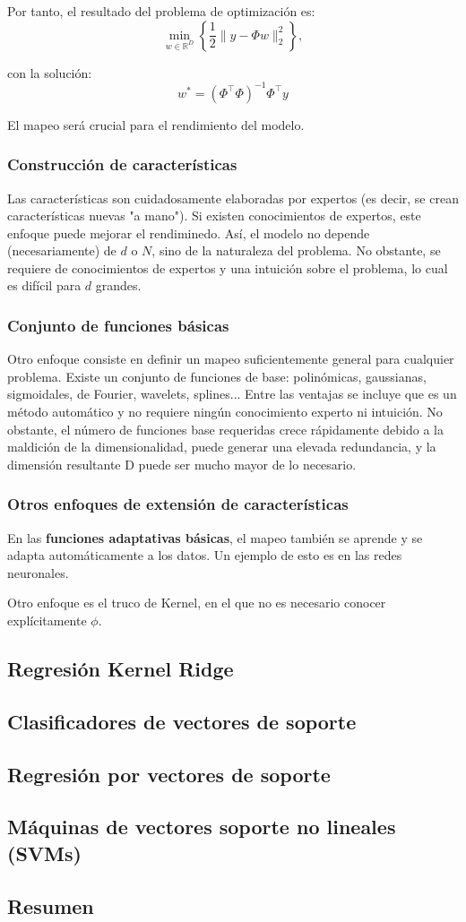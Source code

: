 Por tanto, el resultado del problema de optimización es:
$$\min_{w \in \mathbb{R}^D} \left\{ \frac{1}{2} \|y - \Phi w\|_2^2 \right\},$$

con la solución:
$$w^* = (\Phi^\top \Phi)^{-1} \Phi^\top y$$

El mapeo será crucial para el rendimiento del modelo.

\subsubsection{Construcción de características}
Las características son cuidadosamente elaboradas por expertos (es decir, se crean características nuevas "a mano"). Si existen conocimientos de expertos, este enfoque puede mejorar el rendiminedo. Así, el modelo no depende (necesariamente) de $d$ o $N$, sino de la naturaleza del problema. No obstante, se requiere de conocimientos de expertos y una intuición sobre el problema, lo cual es difícil para $d$ grandes.

\subsubsection{Conjunto de funciones básicas}
Otro enfoque consiste en definir un mapeo suficientemente general para cualquier problema. Existe un conjunto de funciones de base: polinómicas, gaussianas, sigmoidales, de Fourier, wavelets, splines...
Entre las ventajas se incluye que es un método automático y no requiere ningún conocimiento experto ni intuición. No obstante, el número de funciones base requeridas crece rápidamente debido a la maldición de la dimensionalidad, puede generar una elevada redundancia, y la dimensión resultante D puede ser mucho mayor de lo necesario.

\subsubsection{Otros enfoques de extensión de características}
En las \textbf{funciones adaptativas básicas}, el mapeo también se aprende y se adapta automáticamente a los datos. Un ejemplo de esto es en las redes neuronales.

Otro enfoque es el truco de Kernel, en el que no es necesario conocer explícitamente $\phi$.

\subsection{Regresión Kernel Ridge}

\subsection{Clasificadores de vectores de soporte}

\subsection{Regresión por vectores de soporte}

\subsection{Máquinas de vectores soporte no lineales (SVMs)}

\subsection{Resumen}